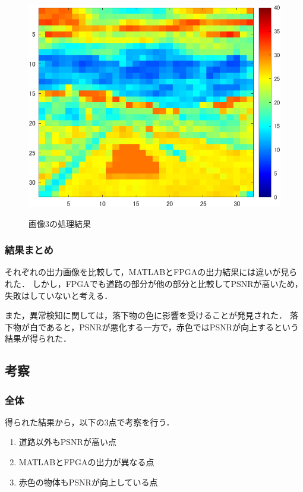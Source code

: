 \documentclass[paper]{ieicej}
\begin{document}
\begin{figure}[tb]
\begin{minipage}[]{0.32\linewidth}
  \end{minipage}
  \begin{minipage}[]{0.32\linewidth}
    \centering
    \includegraphics[width=0.9\columnwidth]{figures/Ex_re6.png}
    \label{fig:3-3-4}
  \end{minipage}
  \caption{画像3の処理結果}
  \label{fig:3-3-1}
\end{figure}

\subsubsection{結果まとめ}
それぞれの出力画像を比較して，MATLABとFPGAの出力結果には違いが見られた．
しかし，FPGAでも道路の部分が他の部分と比較してPSNRが高いため，失敗はしていないと考える．

また，異常検知に関しては，落下物の色に影響を受けることが発見された．
落下物が白であると，PSNRが悪化する一方で，赤色ではPSNRが向上するという結果が得られた．

\subsection{考察}
\subsubsection{全体}
得られた結果から，以下の3点で考察を行う．
\begin{enumerate}
  \item 道路以外もPSNRが高い点 \label{3-1-0}
  \item MATLABとFPGAの出力が異なる点 \label{3-1-1}
  \item 赤色の物体もPSNRが向上している点 \label{3-1-2}
\end{enumerate}
\end{document}
